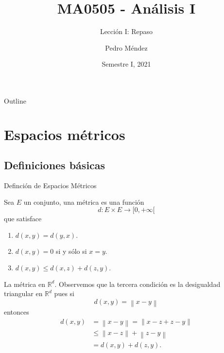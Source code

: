 \documentclass[utf8]{beamer}
\title[MA0505]{MA0505 - An\'alisis I}
\subtitle{Lecci\'on I: Repaso}
\author{Pedro M\'endez\inst{1}}
\institute[Universidad de Costa Rica] %
{
  \inst{1}%
  Departmento de Matem\'atica Pura y Ciencias Actuariales\\
  Universidad de Costa Rica
  }
\date[I-2021] {Semestre I, 2021}
\theoremstyle{plain}
\theoremstyle{definition}
\theoremstyle{remark}
\numberwithin{equation}{section}
\begin{document}
\begin{frame}
  \titlepage
\end{frame}

\begin{frame}{Outline}
  \tableofcontents
\end{frame}





\section{Espacios m\'etricos}

\subsection{Definiciones b\'asicas}

\begin{frame}{Definci\'on de Espacios M\'etricos}%

  Sea $E$ un conjunto, una \alert{m\'etrica} es una funci\'on 
  $$d: E\times E\to[0,+\infty[$$
  que satisface
  \begin{enumerate}
  \item $d(x,y)=d(y,x)$.
  \item $d(x,y)=0$ si y s\'olo si $x=y$.
  \item  $d(x,y)\leq d(x,z)+d(z,y)$. 
  \end{enumerate}
\end{frame}

\begin{frame}{La m\'etrica en $\mathbb R^d$.}
  Observemos que la tercera condici\'on es la desigualdad triangular en $\mathbb R^d$ pues si
  $$d(x,y)=\left\| x-y\right\|$$
  entonces
  \begin{align*}
      d(x,y)&=\left\| x-y\right\|=\left\| x-z+z-y\right\|\\
      &\leq \left\| x-z\right\|+\left\| z-y\right\|\\
      &=d(x,y)+d(z,y).
  \end{align*}
\end{frame}
\end{document}
